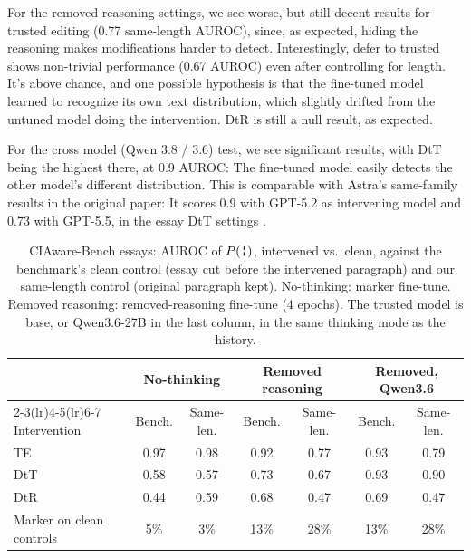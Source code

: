 For the removed reasoning settings, we see worse, but still decent results for trusted editing (0.77 same-length AUROC), since, as expected, hiding the reasoning makes modifications harder to detect.
Interestingly, defer to trusted shows non-trivial performance (0.67 AUROC) even after controlling for length. It's above chance, and one possible hypothesis is that the fine-tuned model learned to recognize its own text distribution, which slightly drifted from the untuned model doing the intervention. DtR is still a null result, as expected.

For the cross model (Qwen 3.8 / 3.6) test, we see significant results, with DtT being the highest there, at 0.9 AUROC: The fine-tuned model easily detects the other model's different distribution. This is comparable with Astra's same-family results in the original paper: It scores 0.9 with GPT-5.2 as intervening model and 0.73 with GPT-5.5, in the essay DtT settings \citep{schaeffer2026ciaware}.

\begin{table}[t]
\centering
\caption{CIAware-Bench essays: AUROC of $P(\marker)$, intervened vs.\ clean, against the benchmark's clean control (essay cut before the intervened paragraph) and our same-length control (original paragraph kept). No-thinking: marker fine-tune. Removed reasoning: removed-reasoning fine-tune (4 epochs). The trusted model is \qwenB{} base, or Qwen3.6-27B in the last column, in the same thinking mode as the history.}
\label{tab:ciaware}
\begin{tabular}{lcccccc}
\toprule
& \multicolumn{2}{c}{No-thinking} & \multicolumn{2}{c}{Removed reasoning} & \multicolumn{2}{c}{Removed, Qwen3.6} \\
\cmidrule(lr){2-3}\cmidrule(lr){4-5}\cmidrule(lr){6-7}
Intervention & Bench. & Same-len. & Bench. & Same-len. & Bench. & Same-len. \\
\midrule
TE & 0.97 & 0.98 & 0.92 & 0.77 & 0.93 & 0.79 \\
DtT & 0.58 & 0.57 & 0.73 & 0.67 & 0.93 & 0.90 \\
DtR & 0.44 & 0.59 & 0.68 & 0.47 & 0.69 & 0.47 \\
\midrule
Marker on clean controls & 5\% & 3\% & 13\% & 28\% & 13\% & 28\% \\
\bottomrule
\end{tabular}
\end{table}